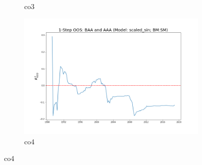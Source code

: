 \documentclass[a4paper,12pt,times,numbered,print,index]{report}
\numberwithin{equation}{section}
\begin{document}
\begin{figure}[!htbp]
\begin{subfigure}[b]{0.42\linewidth}
			\caption{co3}
		\end{subfigure}
		\begin{subfigure}[b]{0.42\linewidth}
			\includegraphics[width=0.9\linewidth]{OOS_plots/scaled_sin_co4_SM.png}
			\caption{co4}
		\end{subfigure}
		\label{g3}
	\end{figure}
	
\end{document}
